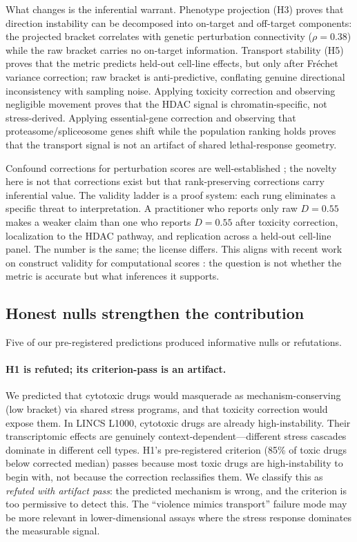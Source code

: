 \documentclass{article}
\begin{document}
What changes is the inferential warrant. Phenotype projection (H3) proves
that direction instability can be decomposed into on-target and off-target
components: the projected bracket correlates with genetic perturbation
connectivity ($\rho = 0.38$) while the raw bracket carries no on-target
information. Transport stability (H5) proves that the metric predicts
held-out cell-line effects, but only after Fr\'{e}chet variance correction;
raw bracket is anti-predictive, conflating genuine directional inconsistency
with sampling noise. Applying toxicity correction and
observing negligible movement proves that the HDAC signal is
chromatin-specific, not stress-derived. Applying essential-gene correction
and observing that proteasome/spliceosome genes shift while the population
ranking holds proves that the transport signal is not an artifact of shared
lethal-response geometry.

Confound corrections for perturbation scores are well-established
\citep{meyers2017ceres,pacini2021integrated}; the novelty here is not that
corrections exist but that rank-preserving corrections carry inferential
value. The validity ladder is a proof system: each rung eliminates a specific
threat to interpretation. A practitioner who reports only raw $D = 0.55$
makes a weaker claim than one who reports $D = 0.55$ after toxicity
correction, localization to the HDAC pathway, and replication across a
held-out cell-line panel. The number is the same; the license differs.
This aligns with recent work on construct validity for computational
scores \citep{freiesleben2025benchmarking,watson2025measuring}: the
question is not whether the metric is accurate but what inferences it
supports.

\subsection{Honest nulls strengthen the contribution}

Five of our pre-registered predictions produced informative nulls or refutations.

\paragraph{H1 is refuted; its criterion-pass is an artifact.}
We predicted that cytotoxic drugs would masquerade as mechanism-conserving
(low bracket) via shared stress programs, and that toxicity correction would
expose them. In LINCS L1000, cytotoxic drugs are already high-instability.
Their transcriptomic effects are genuinely context-dependent---different stress
cascades dominate in different cell types. H1's pre-registered criterion
(85\% of toxic drugs below corrected median) passes because most toxic drugs
are high-instability to begin with, not because the correction reclassifies
them. We classify this as \emph{refuted with artifact pass}: the predicted
mechanism is wrong, and the criterion is too permissive to detect this.
The ``violence mimics transport'' failure mode may be more relevant in
lower-dimensional assays where the stress response dominates the
measurable signal.
\end{document}
